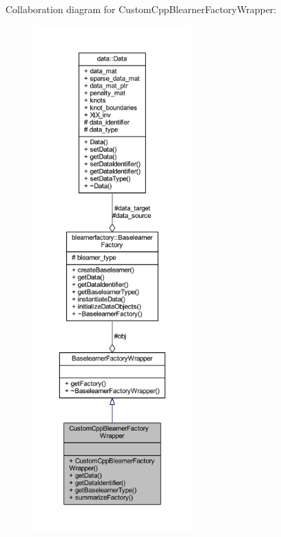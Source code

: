 Collaboration diagram for Custom\+Cpp\+Blearner\+Factory\+Wrapper\+:\nopagebreak
\begin{figure}[H]
\begin{center}
\leavevmode
\includegraphics[height=550pt]{class_custom_cpp_blearner_factory_wrapper__coll__graph}
\end{center}
\end{figure}
